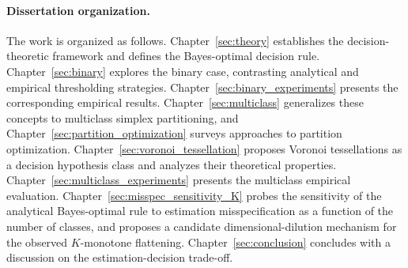 \paragraph{Dissertation organization.} The work is organized as follows. Chapter~\ref{sec:theory} establishes the decision-theoretic framework and defines the Bayes-optimal decision rule. Chapter~\ref{sec:binary} explores the binary case, contrasting analytical and empirical thresholding strategies. Chapter~\ref{sec:binary_experiments} presents the corresponding empirical results. Chapter~\ref{sec:multiclass} generalizes these concepts to multiclass simplex partitioning, and Chapter~\ref{sec:partition_optimization} surveys approaches to partition optimization. Chapter~\ref{sec:voronoi_tessellation} proposes Voronoi tessellations as a decision hypothesis class and analyzes their theoretical properties. Chapter~\ref{sec:multiclass_experiments} presents the multiclass empirical evaluation. Chapter~\ref{sec:misspec_sensitivity_K} probes the sensitivity of the analytical Bayes-optimal rule to estimation misspecification as a function of the number of classes, and proposes a candidate dimensional-dilution mechanism for the observed $K$-monotone flattening. Chapter~\ref{sec:conclusion} concludes with a discussion on the estimation-decision trade-off.
